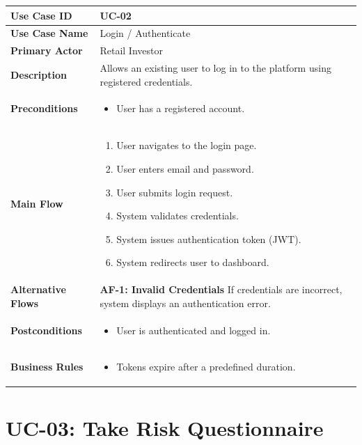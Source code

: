 \begin{longtable}{|>{\raggedright\arraybackslash\bfseries}p{3.5cm}|p{11cm}|}
\hline
\rowcolor{gray!15} Use Case ID & UC-02 \\ \hline
Use Case Name & Login / Authenticate \\ \hline
Primary Actor & Retail Investor \\ \hline
Description & Allows an existing user to log in to the platform using registered credentials. \\ \hline
Preconditions &
\begin{itemize}[leftmargin=*, nosep]
    \item User has a registered account.
\end{itemize} \\ \hline
Main Flow &
\begin{enumerate}[leftmargin=*, nosep]
    \item User navigates to the login page.
    \item User enters email and password.
    \item User submits login request.
    \item System validates credentials.
    \item System issues authentication token (JWT).
    \item System redirects user to dashboard.
\end{enumerate} \\ \hline
Alternative Flows &
\textbf{AF-1: Invalid Credentials} \newline
If credentials are incorrect, system displays an authentication error. \\ \hline
Postconditions &
\begin{itemize}[leftmargin=*, nosep]
    \item User is authenticated and logged in.
\end{itemize} \\ \hline
Business Rules &
\begin{itemize}[leftmargin=*, nosep]
    \item Tokens expire after a predefined duration.
\end{itemize} \\ \hline
\end{longtable}

\section{UC-03: Take Risk Questionnaire}
\label{uc:questionnaire}

